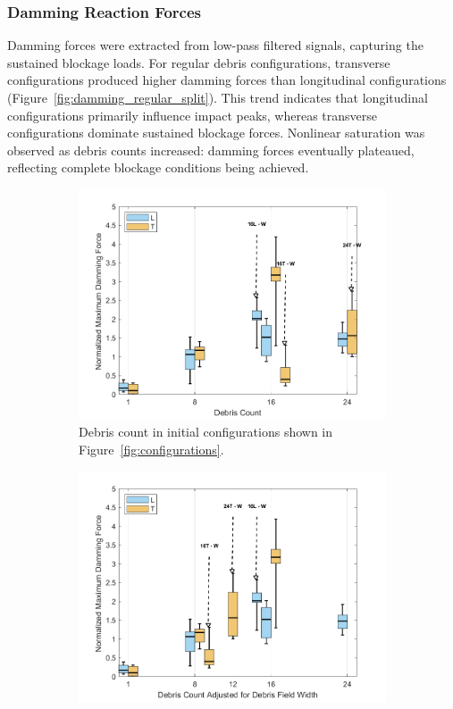 \documentclass{article}
\begin{document}
{\subsubsection{Damming Reaction Forces} 
Damming forces were extracted from low-pass filtered signals, capturing the sustained blockage loads. For regular debris configurations, transverse configurations produced higher damming forces than longitudinal configurations (Figure~\ref{fig:damming_regular_split}). This trend indicates that longitudinal configurations primarily influence impact peaks, whereas transverse configurations dominate sustained blockage forces. Nonlinear saturation was observed as debris counts increased: damming forces eventually plateaued, reflecting complete blockage conditions being achieved. 

\begin{figure}[htbp]
    \centering
    \begin{subfigure}[t]{0.9\textwidth}
        \centering
        \includegraphics[width=\textwidth]{Damming_Regular_SplitByTrial.png}
        \caption{Debris count in initial configurations shown in Figure~\ref{fig:configurations}.}
        \label{fig:damming_regular_original}
    \end{subfigure}
    \hfill
    \begin{subfigure}[t]{0.9\textwidth}
        \centering
        \includegraphics[width=\textwidth]{Damming_Regular_L_T_SplitByTrial_Remapped.png}

\end{subfigure}
\end{figure}}
\end{document}
